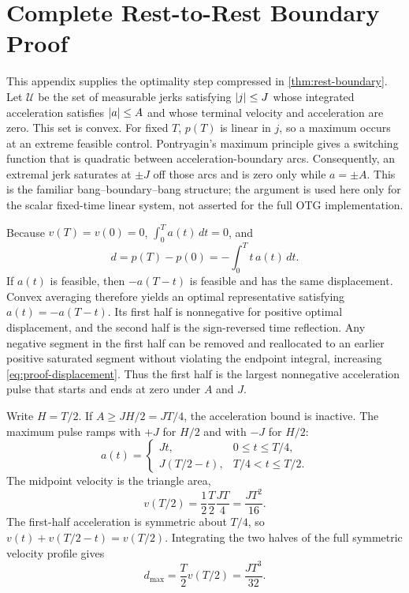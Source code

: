 \section{Complete Rest-to-Rest Boundary Proof}
\label{app:proofs}

This appendix supplies the optimality step compressed in \cref{thm:rest-boundary}. Let $\mathcal U$ be the set of measurable jerks satisfying $\lvert j\rvert\le J$ whose integrated acceleration satisfies $\lvert a\rvert\le A$ and whose terminal velocity and acceleration are zero. This set is convex. For fixed $T$, $p(T)$ is linear in $j$, so a maximum occurs at an extreme feasible control. Pontryagin's maximum principle gives a switching function that is quadratic between acceleration-boundary arcs. Consequently, an extremal jerk saturates at $\pm J$ off those arcs and is zero only while $a=\pm A$. This is the familiar bang--boundary--bang structure; the argument is used here only for the scalar fixed-time linear system, not asserted for the full OTG implementation.

Because $v(T)=v(0)=0$, $\int_0^T a(t)\,dt=0$, and
\begin{equation}
 d=p(T)-p(0)=-\int_0^T t\,a(t)\,dt.
 \label{eq:proof-displacement}
\end{equation}
If $a(t)$ is feasible, then $-a(T-t)$ is feasible and has the same displacement. Convex averaging therefore yields an optimal representative satisfying $a(t)=-a(T-t)$. Its first half is nonnegative for positive optimal displacement, and the second half is the sign-reversed time reflection. Any negative segment in the first half can be removed and reallocated to an earlier positive saturated segment without violating the endpoint integral, increasing \cref{eq:proof-displacement}. Thus the first half is the largest nonnegative acceleration pulse that starts and ends at zero under $A$ and $J$.

Write $H=T/2$. If $A\ge JH/2=JT/4$, the acceleration bound is inactive. The maximum pulse ramps with $+J$ for $H/2$ and with $-J$ for $H/2$:
\begin{equation}
 a(t)=
 \begin{cases}
 Jt,&0\le t\le T/4,\\
 J(T/2-t),&T/4<t\le T/2.
 \end{cases}
 \label{eq:triangular-acceleration}
\end{equation}
The midpoint velocity is the triangle area,
\begin{equation}
 v(T/2)=\frac{1}{2}\frac{T}{2}\frac{JT}{4}=\frac{JT^2}{16}.
\end{equation}
The first-half acceleration is symmetric about $T/4$, so $v(t)+v(T/2-t)=v(T/2)$. Integrating the two halves of the full symmetric velocity profile gives
\begin{equation}
 d_{\max}=\frac{T}{2}v(T/2)=\frac{JT^3}{32}.
\end{equation}

